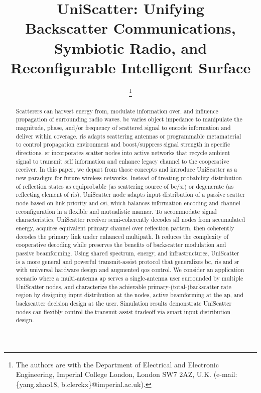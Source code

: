 \documentclass[journal]{IEEEtran}
\begin{document}
\title{UniScatter: Unifying\\Backscatter Communications, Symbiotic Radio, and Reconfigurable Intelligent Surface}
\author{
	\thanks{
		The authors are with the Department of Electrical and Electronic Engineering, Imperial College London, London SW7 2AZ, U.K. (e-mail: \{yang.zhao18, b.clerckx\}@imperial.ac.uk).
	}
}
\maketitle

\begin{abstract}
	Scatterers can harvest energy from, modulate information over, and influence propagation of surrounding radio waves.
	\gls{bc} varies object impedance to manipulate the magnitude, phase, and/or frequency of scattered signal to encode information and deliver within coverage.
	\gls{ris} adapts scattering antennas or programmable metamaterial to control propagation environment and boost/suppress signal strength in specific directions.
	\gls{sr} incorporates scatter nodes into active networks that recycle ambient signal to transmit self information and enhance legacy channel to the cooperative receiver.
	In this paper, we depart from those concepts and introduce UniScatter as a new paradigm for future wireless networks.
	Instead of treating probability distribution of reflection states as equiprobable (as scattering source of \gls{bc}/\gls{sr}) or degenerate (as reflecting element of \gls{ris}), UniScatter node adapts input distribution of a passive scatter node based on link priority and \gls{csi}, which balances information encoding and channel reconfiguration in a flexible and mutualistic manner.
	To accommodate signal characteristics, UniScatter receiver semi-coherently decodes all nodes from accumulated energy, acquires equivalent primary channel over reflection pattern, then coherently decodes the primary link under enhanced multipath.
	It reduces the complexity of cooperative decoding while preserves the benefits of backscatter modulation and passive beamforming.
	Using shared spectrum, energy, and infrastructures, UniScatter is a more general and powerful transmit-assist protocol that generalizes \gls{bc}, \gls{ris} and \gls{sr} with universal hardware design and augmented \gls{qos} control.
	We consider an application scenario where a multi-antenna \gls{ap} serves a single-antenna user surrounded by multiple UniScatter nodes, and characterize the achievable primary-(total-)backscatter rate region by designing input distribution at the nodes, active beamforming at the \gls{ap}, and backscatter decision design at the user.
	Simulation results demonstrate UniScatter nodes can flexibly control the transmit-assist tradeoff via smart input distribution design.
\end{abstract}
\end{document}
